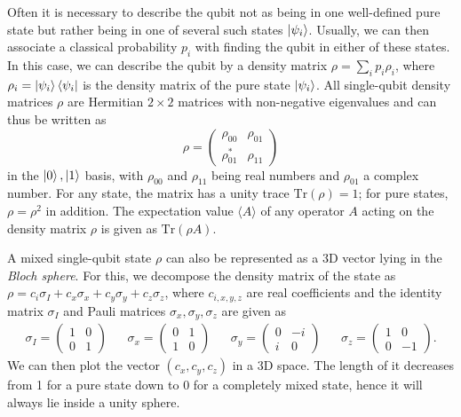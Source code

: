 \smallskip

\smallskip

Often it is necessary to describe the qubit not as being in one well-defined pure state but rather being in one of several such states $\left| \psi_i \right>$. Usually, we can then associate a classical probability $p_i$ with finding the qubit in either of these states. In this case, we can describe the qubit by a density matrix $\rho = \sum\limits_i p_i \rho_i$, where $\rho_i=\left| \psi_{i} \right>\left< \psi_{i} \right|$ is the density matrix of the pure state $\left| \psi_i \right>$. All single-qubit density matrices $\rho$ are Hermitian $2\times 2$ matrices with non-negative eigenvalues and can thus be written as
%
\begin{equation}
\rho = \left( \begin{array}{cc} \rho_{00} & \rho_{01} \\ \rho_{01}^* & \rho_{11} \end{array} \right)
\end{equation}
%
in the ${\left| 0 \right>,\left| 1 \right>}$ basis, with $\rho_{00}$ and $\rho_{11}$ being real numbers and $\rho_{01}$ a complex number. For any state, the matrix has a unity trace $\mathrm{Tr}(\rho)=1$; for pure states, $\rho=\rho^2$ in addition. The expectation value $\langle A \rangle$ of any operator $A$ acting on the density matrix $\rho$ is given as $\mathrm{Tr}(\rho A)$.

\smallskip

A mixed single-qubit state $\rho$ can also be represented as a 3D vector lying in the {\it Bloch sphere}. For this, we decompose the density matrix of the state as $\rho = c_i\sigma_I+c_x\sigma_x+c_y\sigma_y+c_z\sigma_z$, where $c_{i,x,y,z}$ are real coefficients and the identity matrix $\sigma_I$ and Pauli matrices $\sigma_x,\sigma_y,\sigma_z$ are given as
%
\begin{align}
  \sigma_I  =  \left( \begin{array}{cc} 1 & 0 \\ 0 & 1 \end{array} \right)
 & &  \sigma_x  =  \left( \begin{array}{cc} 0 & 1 \\ 1 & 0 \end{array} \right)
  & & \sigma_y  =  \left( \begin{array}{cc} 0 & -i \\ i  &  0\end{array} \right)
  & & \sigma_z  =  \left( \begin{array}{cc} 1 & 0 \\ 0 & -1 \end{array} \right).
\label{eq:pauli_operators}
\end{align}
% 
We can then plot the vector $(c_x,c_y,c_z)$ in a 3D space. The length of it decreases from 1 for a pure state down to 0 for a completely mixed state, hence it will always lie inside a unity sphere.

